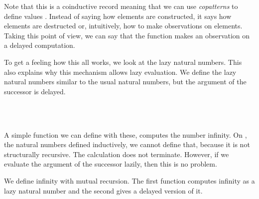 Note that this is a coinductive record meaning that we can use \emph{copatterns} to define values \cite{abel2013copatterns}.
Instead of saying how elements are constructed, it says how elements are destructed or, intuitively, how to make observations on elements.
Taking this point of view, we can say that the function  makes an observation on a delayed computation.

To get a feeling how this all works, we look at the lazy natural numbers.
This also explains why this mechanism allows lazy evaluation.
We define the lazy natural numbers similar to the usual natural numbers, but the argument of the successor is delayed.

\begin{code}%
\>[0]\AgdaSpace{}%
\AgdaSpace{}%
\AgdaSymbol{(}\AgdaSpace{}%
\AgdaSymbol{:}\AgdaSpace{}%
\AgdaSymbol{)}\AgdaSpace{}%
\AgdaSymbol{:}\AgdaSpace{}%
\AgdaSpace{}%
\<%
\\
\>[0][@{}l@{\AgdaIndent{0}}]%
\>[2]\AgdaSpace{}%
\AgdaSymbol{:}\AgdaSpace{}%
\AgdaSpace{}%
\<%
\\
%
\>[2]\AgdaSpace{}%
\AgdaSymbol{:}\AgdaSpace{}%
\AgdaSpace{}%
\AgdaSpace{}%
\AgdaSpace{}%
\AgdaSpace{}%
\AgdaSpace{}%
\<%
\end{code}

A simple function we can define with these, computes the number infinity.
On , the natural numbers defined inductively, we cannot define that, because it is not structurally recursive.
The calculation does not terminate.
However, if we evaluate the argument of the successor lazily, then this is no problem.

We define infinity with mutual recursion.
The first function computes infinity as a lazy natural number and the second gives a delayed version of it.

\begin{code}%
\>[0]\AgdaSpace{}%
\AgdaSymbol{:}\AgdaSpace{}%
\AgdaFunction{\&}\AgdaSpace{}%
\<%
\\
\>[0]\AgdaSpace{}%
\AgdaSymbol{:}\AgdaSpace{}%
\AgdaFunction{\&}\AgdaSymbol{(}\AgdaSpace{}%
\AgdaSymbol{)}\<%
\end{code}

